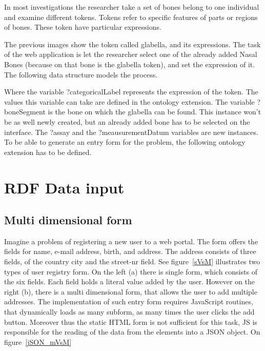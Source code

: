 In most investigations the researcher take a set of bones belong to one individual and examine different tokens. Tokens refer to specific features of parts or regions of bones. These token have particular expressions.


The previous images show the token called glabella, and its expressions. The task of the web application is let the researcher select one of the already added Nasal Bones (because on that bone is the glabella token), and set the expression of it. The following data structure models the process.


Where the variable ?categoricalLabel represents the expression of the token. The values this variable can take are defined in the ontology extension. The variable ?boneSegment is the bone on which the glabella can be found. This instance won’t be as well newly created, but an already added bone has to be selected on the interface. The ?assay and the ?meausurementDatum variables are new instances.  To be able to generate an entry form for the problem, the following ontology extension has to be defined.



\section{RDF Data input}

\subsection{Multi dimensional form}

Imagine a problem of registering a new user to a web portal. The form offers the fields for name, e-mail address, birth, and address. The address consists of three fields, of the country city and the street-nr field. See figure~\ref{sVsM} illustrates two types of user registry form. On the left (a) there is single form, which consists of the six fields. Each field holds a literal value added by the user. However on the right (b), there is a multi dimensional form, that allows the user to add multiple addresses. The implementation of such entry form requires JavaScript routines, that dynamically loads as many subform, as many times the user clicks the add button. Moreover thus the static HTML form is not sufficient for this task, JS is responsible for the reading of the data from the elements into a JSON object.
On figure~\ref{jSON_mVsM} 

